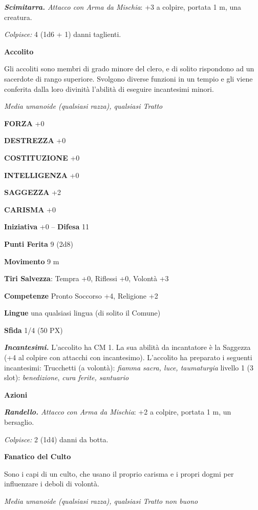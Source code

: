 \begin{multicols}{2}
	\textit{\textbf{Scimitarra.} Attacco con Arma da Mischia}: +3 a colpire, portata 1 m, una creatura.

	\textit{Colpisce:} 4 (1d6 + 1) danni taglienti.

	\medskip\textbf{Accolito}

	Gli accoliti sono membri di grado minore del clero, e di solito rispondono ad un sacerdote di rango superiore. Svolgono diverse funzioni in un tempio e gli viene conferita dalla loro divinità l'abilità di eseguire incantesimi minori.

	\textit{Media umanoide (qualsiasi razza), qualsiasi Tratto}

	\textbf{FORZA} +0

	\textbf{DESTREZZA} +0

	\textbf{COSTITUZIONE} +0

	\textbf{INTELLIGENZA} +0

	\textbf{SAGGEZZA} +2

	\textbf{CARISMA} +0

	\textbf{Iniziativa} +0 -- \textbf{Difesa} 11

	\textbf{Punti Ferita} 9 (2d8)

	\textbf{Movimento} 9 m

	\textbf{Tiri Salvezza}: Tempra +0, Riflessi +0, Volontà +3

	\textbf{Competenze} Pronto Soccorso +4, Religione +2

	\textbf{Lingue} una qualsiasi lingua (di solito il Comune)

	\textbf{Sfida} 1/4 (50 PX)

	\textit{\textbf{Incantesimi.}} L'accolito ha CM 1. La sua abilità da incantatore è la Saggezza (+4 al colpire con attacchi con incantesimo). L'accolito ha preparato i seguenti incantesimi: Trucchetti (a volontà): \textit{fiamma sacra, luce, taumaturgia} livello 1 (3 slot): \textit{benedizione}, \textit{cura ferite, santuario}

	\medskip\textbf{Azioni}

	\textit{\textbf{Randello.} Attacco con Arma da Mischia}: +2 a colpire, portata 1 m, un bersaglio.

	\textit{Colpisce:} 2 (1d4) danni da botta.

	\textbf{Fanatico del Culto}

	Sono i capi di un culto, che usano il proprio carisma e i propri dogmi per influenzare i deboli di volontà.

	\textit{Media umanoide (qualsiasi razza), qualsiasi Tratto non buono}


\end{multicols}

